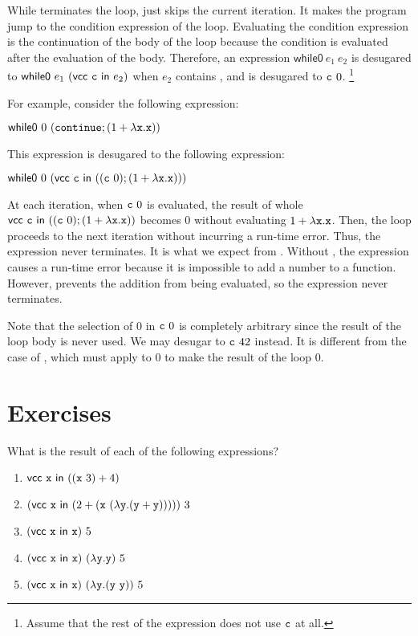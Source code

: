 While  terminates the loop,  just skips the current
iteration. It makes the program jump to the condition expression of the loop.
Evaluating the condition expression is the continuation of the body of the loop
because the condition is evaluated after the evaluation of the
body. Therefore, an expression $\textsf{while0}\ e_1\ e_2$ is desugared to
$\textsf{while0}\ e_1\ (\evcc{\code{c}}{e_2})$ when $e_2$ contains
, and  is desugared to $\code{c}\ 0$.
\footnote{Assume that the rest of the expression does not use $\texttt{c}$ at all.}

For example, consider the following expression:

$\textsf{while0}\ 0\ (\code{continue};(1+\efun{\cx}{\cx}))$

This expression is desugared to the following expression:

$\textsf{while0}\ 0\ (\evcc{\code{c}}{((\code{c}\ 0);(1+\efun{\cx}{\cx}))})$

At each iteration, when $\code{c}\ 0$ is evaluated,
the result of whole $\evcc{\code{c}}{((\code{c}\ 0);(1+\efun{\cx}{\cx}))}$ becomes
$0$ without evaluating $1+\lambda\texttt{x}.\texttt{x}$. Then, the loop proceeds to the
next iteration without incurring a run-time error. Thus, the expression never
terminates. It is what we expect from . Without ,
the expression causes a run-time error because it is impossible to add a number to
a function. However,  prevents the addition from being evaluated,
so the expression never terminates.

Note that the selection of $0$ in $\code{c}\ 0$ is completely arbitrary
since the result of the loop body is
never used. We may desugar  to $\texttt{c}\ 42$ instead. It is
different from the case of , which must apply  to $0$ to
make the result of the loop $0$.

\section{Exercises}

\begin{exercise}

What is the result of each of the following expressions?

\begin{enumerate}
  \item $\textsf{vcc}\ \texttt{x}\ \textsf{in}\ ((\texttt{x}\ 3)+4)$
  \item $(\textsf{vcc}\ \texttt{x}\ \textsf{in}\ (2+(\texttt{x}\ (\lambda\texttt{y}.(\texttt{y}+\texttt{y})))))\ 3$
  \item $\eapp{\eapp{(\evcc{\cx}{\cx})}{5}}$
  \item $(\textsf{vcc}\ \texttt{x}\ \textsf{in}\ \texttt{x})\ (\lambda\texttt{y}.\texttt{y})\ 5$
  \item $(\textsf{vcc}\ \texttt{x}\ \textsf{in}\ \texttt{x})\ (\lambda\texttt{y}.(\texttt{y}\ \texttt{y}))\ 5$
\end{enumerate}

\end{exercise}

